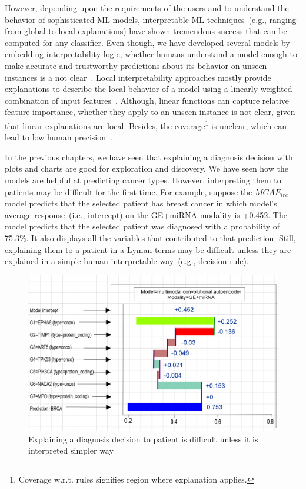\hspace*{3.5mm} However, depending upon the requirements of the users and to understand the behavior of sophisticated ML models, interpretable ML techniques~(e.g., ranging from global to local explanations) have shown tremendous success that can be computed for any classifier. Even though, we have developed several models by embedding interpretability logic, whether humans understand a model enough to make accurate and trustworthy predictions about its behavior on unseen instances is a not clear~\cite{ribeiro2018anchors}. Local interpretability approaches mostly provide explanations to describe the local behavior of a model using a linearly weighted combination of input features~\cite{baehrens2010explain}. Although, linear functions can capture relative feature importance, whether they apply to an unseen instance is not clear, given that linear explanations are local. Besides, the coverage\footnote{Coverage w.r.t. rules signifies region where explanation applies.} is unclear, which can lead to low human precision~\cite{ribeiro2018anchors}. 

\hspace*{3.5mm} In the previous chapters, we have seen that explaining a diagnosis decision with plots and charts are good for exploration and discovery. We have seen how the models are helpful at predicting cancer types. However, interpreting them to patients may be difficult for the first time. For example, suppose the $MCAE_{lrc}$ model predicts that the selected patient has breast cancer in which model's average response~(i.e., intercept) on the GE+miRNA modality is +0.452. The model predicts that the selected patient was diagnosed with a probability of 75.3\%. It also displays all the variables that contributed to that prediction. Still, explaining them to a patient in a Lyman terms may be difficult unless they are explained in a simple human-interpretable way~(e.g., decision rule).  

\begin{figure}[h]
	\centering
		\includegraphics[scale=0.6]{images/intercept.png}
	    \caption{Explaining a diagnosis decision to patient is difficult unless it is interpreted simpler way}
	\label{problem_of_xai:1}
\end{figure}


